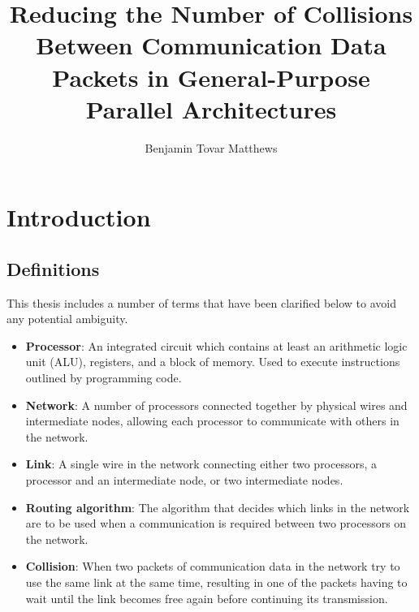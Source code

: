 \documentclass[a4paper, 12pt]{article}
\title{Reducing the Number of Collisions Between Communication Data Packets in General-Purpose Parallel Architectures}
\author{Benjamin Tovar Matthews}
\begin{document}
\setcounter{page}{0}
\maketitle

\begin{abstract}

\end{abstract}

\thispagestyle{empty}
\newpage
{}
\setcounter{tocdepth}{2}
\tableofcontents
\newpage
\listoffigures

\newpage
\section{Introduction}

\subsection{Definitions}

This thesis includes a number of terms that have been clarified below to avoid any potential ambiguity.
\begin{itemize}[leftmargin=0cm]

\item[] \textbf{Processor}: An integrated circuit which contains at least an arithmetic logic unit (ALU), registers, and a block of memory. Used to execute instructions outlined by programming code.

\item[] \textbf{Network}: A number of processors connected together by physical wires and intermediate nodes, allowing each processor to communicate with others in the network.

\item[] \textbf{Link}: A single wire in the network connecting either two processors, a processor and an intermediate node, or two intermediate nodes.

\item[] \textbf{Routing algorithm}: The algorithm that decides which links in the network are to be used when a communication is required between two processors on the network.

\item[] \textbf{Collision}: When two packets of communication data in the network try to use the same link at the same time, resulting in one of the packets having to wait until the link becomes free again before continuing its transmission.

\end{itemize}
\end{document}

